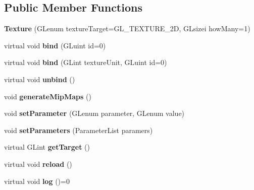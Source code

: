 \subsection*{Public Member Functions}
\begin{DoxyCompactItemize}
\item 
{\bfseries Texture} (G\+Lenum texture\+Target=G\+L\+\_\+\+T\+E\+X\+T\+U\+R\+E\+\_\+2D, G\+Lsizei how\+Many=1)\hypertarget{classflw_1_1flc_1_1Texture_a3b6675d9cfb0d57b65cca59a32138113}{}\label{classflw_1_1flc_1_1Texture_a3b6675d9cfb0d57b65cca59a32138113}

\item 
virtual void {\bfseries bind} (G\+Luint id=0)\hypertarget{classflw_1_1flc_1_1Texture_aec839f04ce20d230c74ea421cb680d6b}{}\label{classflw_1_1flc_1_1Texture_aec839f04ce20d230c74ea421cb680d6b}

\item 
virtual void {\bfseries bind} (G\+Lint texture\+Unit, G\+Luint id=0)\hypertarget{classflw_1_1flc_1_1Texture_a1e2606b0108a96961baf415cb7499bbb}{}\label{classflw_1_1flc_1_1Texture_a1e2606b0108a96961baf415cb7499bbb}

\item 
virtual void {\bfseries unbind} ()\hypertarget{classflw_1_1flc_1_1Texture_a96a5f0712aa37f70469b7567a55c86a5}{}\label{classflw_1_1flc_1_1Texture_a96a5f0712aa37f70469b7567a55c86a5}

\item 
void {\bfseries generate\+Mip\+Maps} ()\hypertarget{classflw_1_1flc_1_1Texture_a6d9e50f8a5b5434a8b49609565db7d6c}{}\label{classflw_1_1flc_1_1Texture_a6d9e50f8a5b5434a8b49609565db7d6c}

\item 
void {\bfseries set\+Parameter} (G\+Lenum parameter, G\+Lenum value)\hypertarget{classflw_1_1flc_1_1Texture_acce15bddb3502c2e58fc94e494d4754d}{}\label{classflw_1_1flc_1_1Texture_acce15bddb3502c2e58fc94e494d4754d}

\item 
void {\bfseries set\+Parameters} (Parameter\+List paramers)\hypertarget{classflw_1_1flc_1_1Texture_aa9b40d4b1696ce652c222b5c38d988e1}{}\label{classflw_1_1flc_1_1Texture_aa9b40d4b1696ce652c222b5c38d988e1}

\item 
virtual G\+Lint {\bfseries get\+Target} ()\hypertarget{classflw_1_1flc_1_1Texture_a437318c485e6ed15b9dd44e2a529eb74}{}\label{classflw_1_1flc_1_1Texture_a437318c485e6ed15b9dd44e2a529eb74}

\item 
virtual void {\bfseries reload} ()\hypertarget{classflw_1_1flc_1_1Texture_ac88fdab85f6f2832db0eeb71925636db}{}\label{classflw_1_1flc_1_1Texture_ac88fdab85f6f2832db0eeb71925636db}

\item 
virtual void {\bfseries log} ()=0\hypertarget{classflw_1_1flc_1_1Texture_a8951294059d14c3f924c2e45a17c0bff}{}\label{classflw_1_1flc_1_1Texture_a8951294059d14c3f924c2e45a17c0bff}

\end{DoxyCompactItemize}
